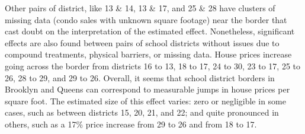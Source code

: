 \documentclass{article}
\begin{document}
	Other pairs of district, like 13 \& 14, 13 \& 17, and 25 \& 28 have clusters of missing data (condo sales with unknown square footage) near the border that cast doubt on the interpretation of the estimated effect.
Nonetheless, significant effects are also found between pairs of school districts without issues due to compound treatments, physical barriers, or missing data.
House prices increase going across the border from districts 16 to 13, 18 to 17, 24 to 30, 23 to 17, 25 to 26, 28 to 29, and 29 to 26.
Overall, it seems that school district borders in Brooklyn and Queens can correspond to measurable jumps in house prices per square foot.
The estimated size of this effect varies: zero or negligible in some cases, such as between districts 15, 20, 21, and 22; and quite pronounced in others, such as a 17\% price increase from 29 to 26 and from 18 to 17.
\end{document}
